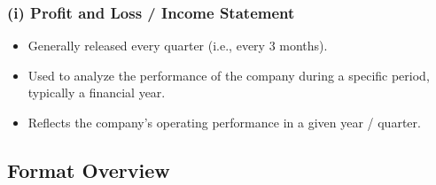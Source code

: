 \documentclass[12pt]{article}
\begin{document}
\subsubsection*{(i) Profit and Loss / Income Statement}

\begin{itemize}
    \item Generally released every quarter (i.e., every 3 months).
    \item Used to analyze the performance of the company during a specific period, typically a financial year.
    \item Reflects the company's operating performance in a given year / quarter.
\end{itemize}

\subsection*{Format Overview}

\renewcommand{\arraystretch}{1.5}
\setlength{\tabcolsep}{10pt}
\end{document}
